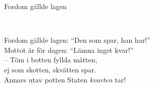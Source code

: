 \begin{song}{Fordom gällde lagen}
	
	
	\\
	
	
	Fordom gällde lagen: ``Den som spar, han har!''\\
	Mottot är för dagen: ``Lämna inget kvar!''\\
	-- Töm i botten fyllda måtten,\\
	ej som skotten, skvätten spar.\\
	Annars utav potten Staten \emph{kvarten} tar!

	
\end{song}
